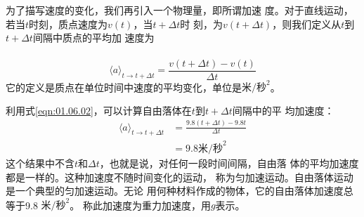 \section[加速度]{}\label{sec:01.08}

为了描写速度的变化，我们再引入一个物理量，即所谓加速
度。对于直线运动，若当$t$时刻，质点速度为$v\left(t\right)$，当$t+\Delta t$时
刻，为$v\left(t+\Delta t\right)$，则我们定义从$t$到$t+\Delta t$间隔中质点的平均加
速度为\\~\vspace{-2em}
\begin{equation}\label{eqn:01.08.01}
  \langle a\rangle_{t\rightarrow t+\Delta t} = \frac{v\left(t+\Delta t\right)-v\left(t\right)}{\Delta t}
\end{equation}
它的定义是质点在单位时间中速度的平均变化，单位是$\text{米/秒}^2$。

利用式\eqref{eqn:01.06.02}，可以计算自由落体在$t$到$t+\Delta t$间隔中的平
均加速度：\vspace{-1em}
\begin{equation*}
  \begin{aligned}
    \langle a\rangle_{t\rightarrow t+\Delta t} & = \frac{9.8\left(t+\Delta t\right)-9.8t}{\Delta t} \\
                                               & = 9.8\text{米/秒}^2
  \end{aligned}
\end{equation*}
这个结果中不含$t$和$\Delta t$，也就是说，对任何一段时间间隔，自由落
体的平均加速度都是一样的。这种加速度不随时间变化的运动，
称为匀加速运动。自由落体运动是一个典型的匀加速运动。无论
用何种材料作成的物体，它的自由落体加速度总等于9.8 $\text{米/秒}^2$。
称此加速度为重力加速度，用$g$表示。

